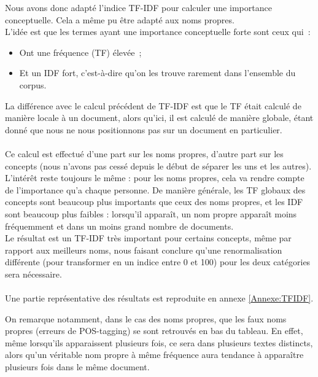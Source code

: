 \documentclass[a4paper, 12pt]{article}
\begin{document}
Nous avons donc adapté l'indice TF-IDF pour calculer une importance conceptuelle. Cela a même pu être adapté aux noms propres.\\

L'idée est que les termes ayant une importance conceptuelle forte sont ceux qui~:
\begin{itemize}
 \item Ont une fréquence (TF) élevée~;
 \item Et un IDF fort, c'est-à-dire qu'on les trouve rarement dans l'ensemble du corpus.
\end{itemize}

La différence avec le calcul précédent de TF-IDF est que le TF était calculé de manière locale à un document, alors qu'ici, il est calculé de manière globale, étant donné que nous ne nous positionnons pas sur un document en particulier.

\paragraph{}
Ce calcul est effectué d'une part sur les noms propres, d'autre part sur les concepts (nous n'avons pas cessé depuis le début de séparer les uns et les autres). L'intérêt reste toujours le même : pour les noms propres, cela va rendre compte de l'importance qu'a chaque personne. De manière générale, les TF globaux des concepts sont beaucoup plus importants que ceux des noms propres, et les IDF sont beaucoup plus faibles : lorsqu'il apparaît, un nom propre apparaît moins fréquemment et dans un moins grand nombre de documents.\\

Le résultat est un TF-IDF très important pour certains concepts, même par rapport aux meilleurs noms, nous faisant conclure qu'une renormalisation différente (pour transformer en un indice entre 0 et 100) pour les deux catégories sera nécessaire.

\paragraph{}
Une partie représentative des résultats est reproduite en annexe \ref{Annexe:TFIDF}.

On remarque notamment, dans le cas des noms propres, que les faux noms propres (erreurs de POS-tagging) se sont retrouvés en bas du tableau. En effet, même lorsqu'ils apparaissent plusieurs fois, ce sera dans plusieurs textes distincts, alors qu'un véritable nom propre à même fréquence aura tendance à apparaître plusieurs fois dans le même document.
\end{document}
